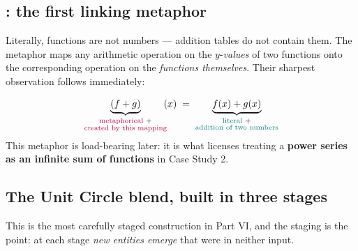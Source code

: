 \subsection{\texorpdfstring{}{Functions Are Numbers}: the first linking metaphor}

Literally, functions are not numbers --- addition tables do not contain them. The metaphor maps any
arithmetic operation on the $y$-\emph{values} of two functions onto the corresponding operation on
the \emph{functions themselves}. Their sharpest observation follows immediately:

\begin{keybox}[title={The two ``$+$'' signs are not the same sign \normalfont\itshape(book p.~386 / pdf p.~405)}]
\[
\underbrace{(f+g)}_{\substack{\text{\color{purple}metaphorical }+\\ \text{\color{purple}created by this mapping}}}\!\!(x)
\;=\;
\underbrace{f(x)+g(x)}_{\substack{\text{\color{teal}literal }+\\ \text{\color{teal}addition of two numbers}}}
\]
This metaphor is load-bearing later: it is what licenses treating a \textbf{power series as an
infinite sum of functions} in Case Study 2.
\end{keybox}

\subsection{The Unit Circle blend, built in three stages}

This is the most carefully staged construction in Part VI, and the staging is the point: at each
stage \emph{new entities emerge} that were in neither input.

